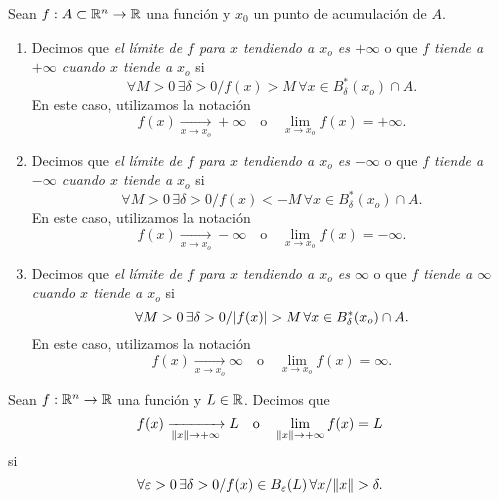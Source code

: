 \begin{definition} \label{def:lim_inf}
  Sean $f : A \subset \mathbb{R}^n \to \mathbb{R}$ una funci\'on y $x_0$ un punto de acumulaci\'on de $A$. 
  \begin{enumerate} %
   \item Decimos que \emph{el l\'imite de $f$ para $x$ tendiendo a $x_o$ es $+\infty$} o que \emph{$f$ tiende a $+\infty$ cuando $x$ tiende a $x_o$} si
    \[
      \forall M > 0 \, \exists \delta > 0 / f(x) > M \, \forall 
	  x \in B_{\delta}^*(x_o) \cap A.
    \]
    En este caso, utilizamos la notaci\'on
    \[
      f(x) \xrightarrow[x \to x_o]{} +\infty \quad \text{o} \quad \lim_{x \to x_o} f(x) = +\infty.
    \]
   \item Decimos que \emph{el l\'imite de $f$ para $x$ tendiendo a $x_o$ es $-\infty$} o que \emph{$f$ tiende a $-\infty$ cuando $x$ tiende a $x_o$} si
    \[
      \forall M > 0 \, \exists \delta > 0 / f(x) < -M \, \forall 
	  x \in B_{\delta}^*(x_o) \cap A.
    \]
    En este caso, utilizamos la notaci\'on
    \[
      f(x) \xrightarrow[x \to x_o]{} -\infty \quad \text{o} \quad \lim_{x \to x_o} f(x) = -\infty.
    \]
   \item Decimos que \emph{el l\'imite de $f$ para $x$ tendiendo a $x_o$ es $\infty$} o que \emph{$f$ tiende a $\infty$ cuando $x$ tiende a $x_o$} si
    \[
      \forall M > 0 \, \exists \delta > 0 / \abs{f(x)} > M \, \forall 
	  x \in B_{\delta}^*(x_o) \cap A.
    \]
    En este caso, utilizamos la notaci\'on
    \[
      f(x) \xrightarrow[x \to x_o]{} \infty \quad \text{o} \quad \lim_{x \to x_o} f(x) = \infty.
    \]
  \end{enumerate}
\end{definition}

\begin{definition} \label{def:lim_x_inf}
Sean $f : \mathbb{R}^n \to \mathbb{R}$ una funci\'on y $L \in \mathbb{R}$. Decimos que
\[
 f(x) \xrightarrow[\norm{x} \to +\infty]{} L \quad \text{o} \quad \lim_{\norm{x} \to +\infty} f(x) = L
\]
si 
\[ 
 \forall \varepsilon > 0 \, \exists \delta > 0 / f(x) \in B_{\varepsilon}(L) \, \forall 
 x / \norm{x} > \delta.
\]
\end{definition}


\iffalse
\begin{propertie} \label{prop:lim_2}
 Sean $f:A \subset \Rn{m} \to \Rn{m}$, $g:A \to \R$ y $x_0$ un punto de acumulaci\'on de $A$, tales que 
 \[
  \lim_{x \to x_o} g(x) = L_g \quad \wedge \quad \lim_{x \to x_o} \left( (f + g)_{(x)} \right) = L.
 \]
 Entonces, existe el l\'imite $\lim_{x \to x_o} f(x)$ y, adem\'as, $\lim_{x \to x_o} f(x) = L - L_g$.
\end{propertie}
\fi
